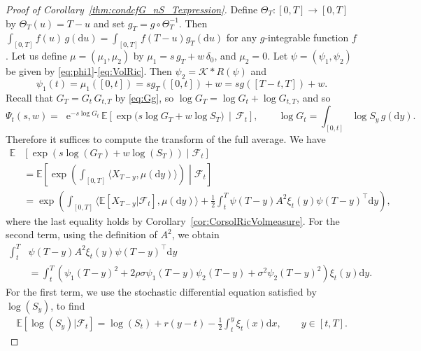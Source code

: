 \documentclass[10pt,a4paper,reqno]{amsart}
\newcommand*{\E}{\mathop{} \mathrm{e}}
\theoremstyle{plain}
\theoremstyle{definition}
\theoremstyle{remark}
\theoremstyle{example}
\begin{document}
\begin{proof}[Proof of Corollary~\ref{thm:condcfG_nS_Texpression}]
    Define $\Theta_T: [0,T] \longrightarrow [0,T]$ by $\Theta_T(u) = T - u$ and set $g_T = g \circ \Theta_T^{-1}$. Then $\int_{[0,T]}f(u)\, g(\mathrm{d}u) = \int_{[0,T]} f(T-u)g_T(\mathrm{d}u)$ for any $g$-integrable function $f$. Let us define $\mu = (\mu_1, \mu_2)$ by $\mu_1 = s\,g_T + w\,\delta_0$, and $\mu_2 = 0$. Let $\psi = (\psi_1, \psi_2)$ be given by \eqref{eq:phi1}-\eqref{eq:VolRic}. Then $\psi_2 = \mathcal{K} \ast R(\psi)$ and
    $$
        \psi_1(t) = \mu_1([0,t]) = s g_T([0,t]) + w = s g([T-t,T]) + w.
    $$
    Recall that $G_T = G_t\,G_{t,T}$ by \eqref{eq:Gg}, so $\log G_T = \log G_t + \log G_{t,T}$, and so
    \begin{equation}\label{eq:psit-GT-relation}
        \Psi_t(s,w)
        = \E^{-s\log G_t}\,\mathbb{E}\!\left[\exp\bigl( s \log G_T + w\log S_T \bigr)\,\middle|\, \mathcal{F}_t\right],
        \qquad \log G_t = \int_{[0,t]} \log S_y\,g(\mathrm{d}y).
    \end{equation}
    Therefore it suffices to compute the transform of the full average. We have
    \begin{align*}
        \mathbb{E}&\left[\exp \left( s \log(G_T) + w\log(S_T) \right)\middle| \mathcal{F}_{t}\right]
        \\ &= \mathbb{E}\left[\exp \left(\int_{[0,T]}\langle X_{T-y},\mu(\mathrm{d} y)\rangle \right)\middle|\mathcal{F}_{t}\right]
        \\ &= \exp \left(\int_{[0,T]}\langle\mathbb{E}[X_{T-y}|\mathcal{F}_{t}],\mu(\mathrm{d} y)\rangle + \frac{1}{2}\int_{t}^{T}\psi(T-y)A^2\xi_{t}(y)\psi(T-y)^\top\mathrm{d} y \right),
    \end{align*}
    where the last equality holds by Corollary~\ref{cor:CorsolRicVolmeasure}. For the second term, using the definition of $A^2$, we obtain
    \begin{align*}
        \int_{t}^{T}&\psi(T-y)A^2\xi_{t}(y)\psi(T-y)^\top\mathrm{d} y \\
        &= \int_{t}^{T}\left(\psi_1(T-y)^2+2\rho\sigma\psi_1(T-y)\psi_2(T-y)+\sigma^2\psi_2(T-y)^2\right)\xi_{t}(y)\mathrm{d} y.
    \end{align*}
    For the first term, we use the stochastic differential equation satisfied by $\log(S_y)$, to find
    \begin{align*}
        \mathbb{E}[\log(S_y)|\mathcal{F}_{t}] = \log(S_{t}) + r(y-t) - \frac{1}{2}\int_{t}^y\xi_{t}(x)\mathrm{d} x, \qquad y \in [t,T].
    \end{align*}    

\end{proof}
\end{document}
